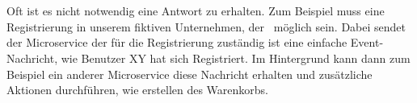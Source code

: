 \\\\
Oft ist es nicht notwendig eine Antwort zu erhalten. Zum Beispiel muss eine Registrierung in unserem fiktiven Unternehmen, der \gmbh\ möglich sein. Dabei sendet der Microservice der für die Registrierung zuständig ist eine einfache Event-Nachricht, wie Benutzer XY hat sich Registriert. Im Hintergrund kann dann zum Beispiel ein anderer Microservice diese Nachricht erhalten und zusätzliche Aktionen durchführen, wie erstellen des Warenkorbs.